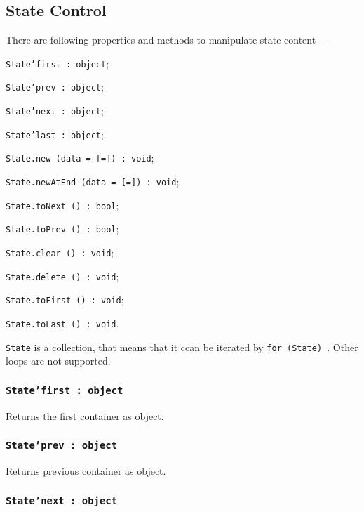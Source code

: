 \subsection{State Control}

There are following properties and methods to manipulate state content —
\begin{icItems}
	\item \texttt{State'first : object};
	\item \texttt{State'prev : object};
	\item \texttt{State'next : object};
	\item \texttt{State'last : object};
	\item \texttt{State.new (data = [=]) : void};
	\item \texttt{State.newAtEnd (data = [=]) : void};
	\item \texttt{State.toNext () : bool};
	\item \texttt{State.toPrev () : bool};
	\item \texttt{State.clear () : void};
	\item \texttt{State.delete () : void};
	\item \texttt{State.toFirst () : void};
	\item \texttt{State.toLast () : void}.
\end{icItems}

\texttt{State} is a collection, that means that it ccan be iterated by \texttt{for (State) {}}. Other loops are not supported.

\subsubsection{\texttt{State'first : object}}

Returns the first container as object.

\subsubsection{\texttt{State'prev : object}}

Returns previous container as object.

\subsubsection{\texttt{State'next : object}}


